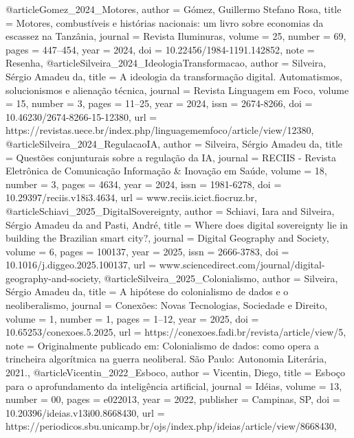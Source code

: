 @article{Gomez_2024_Motores,
  author  = {Gómez, Guillermo Stefano Rosa},
  title   = {Motores, combustíveis e histórias nacionais: um livro sobre economias da escassez na Tanzânia},
  journal = {Revista Iluminuras},
  volume  = {25},
  number  = {69},
  pages   = {447--454},
  year    = {2024},
  doi     = {10.22456/1984-1191.142852},
  note    = {Resenha},
}
@article{Silveira_2024_IdeologiaTransformacao,
  author  = {Silveira, Sérgio Amadeu da},
  title   = {A ideologia da transformação digital. Automatismos, solucionismos e alienação técnica},
  journal = {Revista Linguagem em Foco},
  volume  = {15},
  number  = {3},
  pages   = {11--25},
  year    = {2024},
  issn    = {2674-8266},
  doi     = {10.46230/2674-8266-15-12380},
  url     = {https://revistas.uece.br/index.php/linguagememfoco/article/view/12380},
}
@article{Silveira_2024_RegulacaoIA,
  author  = {Silveira, Sérgio Amadeu da},
  title   = {Questões conjunturais sobre a regulação da IA},
  journal = {RECIIS - Revista Eletrônica de Comunicação Informação \& Inovação em Saúde},
  volume  = {18},
  number  = {3},
  pages   = {4634},
  year    = {2024},
  issn    = {1981-6278},
  doi     = {10.29397/reciis.v18i3.4634},
  url     = {www.reciis.icict.fiocruz.br},
}
@article{Schiavi_2025_DigitalSovereignty,
  author  = {Schiavi, Iara and Silveira, Sérgio Amadeu da and Pasti, André},
  title   = {Where does digital sovereignty lie in building the Brazilian smart city?},
  journal = {Digital Geography and Society},
  volume  = {6},
  pages   = {100137},
  year    = {2025},
  issn    = {2666-3783},
  doi     = {10.1016/j.diggeo.2025.100137},
  url     = {www.sciencedirect.com/journal/digital-geography-and-society},
}
@article{Silveira_2025_Colonialismo,
  author  = {Silveira, Sérgio Amadeu da},
  title   = {A hipótese do colonialismo de dados e o neoliberalismo},
  journal = {Conexões: Novas Tecnologias, Sociedade e Direito},
  volume  = {1},
  number  = {1},
  pages   = {1--12},
  year    = {2025},
  doi     = {10.65253/conexoes.5.2025},
  url     = {https://conexoes.fadi.br/revista/article/view/5},
  note    = {Originalmente publicado em: Colonialismo de dados: como opera a trincheira algorítmica na guerra neoliberal. São Paulo: Autonomia Literária, 2021.},
}
@article{Vicentin_2022_Esboco,
  author  = {Vicentin, Diego},
  title   = {Esboço para o aprofundamento da inteligência artificial},
  journal = {Idéias},
  volume  = {13},
  number  = {00},
  pages   = {e022013},
  year    = {2022},
  publisher = {Campinas, SP},
  doi     = {10.20396/ideias.v13i00.8668430},
  url     = {https://periodicos.sbu.unicamp.br/ojs/index.php/ideias/article/view/8668430},
}

